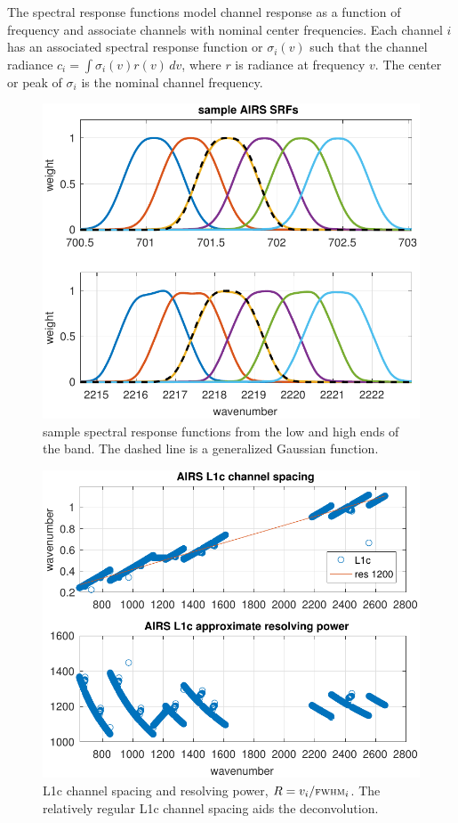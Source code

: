 \documentclass[10pt,twocolumn]{article}
\begin{document}
The {\airs} spectral response functions model channel response as a
function of frequency and associate channels with nominal center
frequencies.  Each {\airs} channel $i$ has an associated spectral
response function or {\srf} $\sigma_i(v)$ such that the channel
radiance $c_i = \int \sigma_i(v)r(v)\,dv$, where $r$ is radiance at
frequency $v$.  The center or peak of $\sigma_i$ is the nominal
channel frequency.

\begin{figure} %
  \centering
  \includegraphics[width=\linewidth]{figures/airs_sample_SRF.pdf}
  \caption{sample {\airs} spectral response functions from the low
    and high ends of the band.   The dashed line is a generalized
    Gaussian function.}
  \label{srfs1}
\end{figure}

\begin{figure} %
  \centering
  \includegraphics[width=\linewidth]{figures/airs_L1c_res.pdf}
  \caption{{\airs} L1c channel spacing and resolving power, $R =
    v_i/\mbox{\small\textsc{fwhm}}_i$.  The relatively regular L1c channel spacing aids
    the deconvolution.}
  \label{chan1}
\end{figure}
\end{document}
